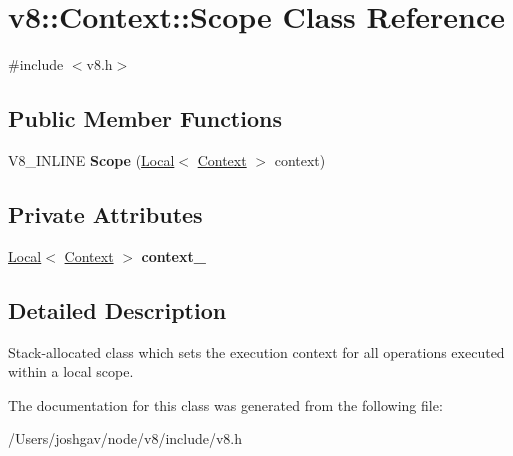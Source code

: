 \hypertarget{classv8_1_1_context_1_1_scope}{}\section{v8\+:\+:Context\+:\+:Scope Class Reference}
\label{classv8_1_1_context_1_1_scope}


{\ttfamily \#include $<$v8.\+h$>$}

\subsection*{Public Member Functions}
\begin{DoxyCompactItemize}
\item 
V8\+\_\+\+I\+N\+L\+I\+NE {\bfseries Scope} (\hyperlink{classv8_1_1_local}{Local}$<$ \hyperlink{classv8_1_1_context}{Context} $>$ context)\hypertarget{classv8_1_1_context_1_1_scope_a3c7ec79eb92ab9bb2784e4ff0c5557c1}{}\label{classv8_1_1_context_1_1_scope_a3c7ec79eb92ab9bb2784e4ff0c5557c1}

\end{DoxyCompactItemize}
\subsection*{Private Attributes}
\begin{DoxyCompactItemize}
\item 
\hyperlink{classv8_1_1_local}{Local}$<$ \hyperlink{classv8_1_1_context}{Context} $>$ {\bfseries context\+\_\+}\hypertarget{classv8_1_1_context_1_1_scope_a59884a1f9bba50754d1c1dd2ec0fec99}{}\label{classv8_1_1_context_1_1_scope_a59884a1f9bba50754d1c1dd2ec0fec99}

\end{DoxyCompactItemize}


\subsection{Detailed Description}
Stack-\/allocated class which sets the execution context for all operations executed within a local scope. 

The documentation for this class was generated from the following file\+:\begin{DoxyCompactItemize}
\item 
/\+Users/joshgav/node/v8/include/v8.\+h\end{DoxyCompactItemize}
